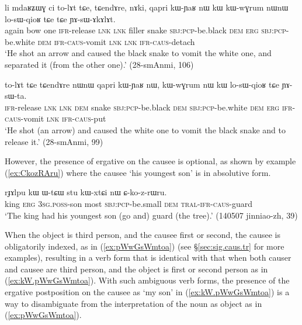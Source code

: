 \begin{exe}
\ex \label{ex:kW.losWqioR1}
 \gll   li mdaʁʑɯɣ ci to-lɤt tɕe, tɕendɤre, nɤki, qapri kɯ-ɲaʁ nɯ kɯ kɯ-wɣrum nɯnɯ lo-sɯ-qioʁ tɕe tɕe ɲɤ-sɯ-ɤkɤlɤt. \\
 again bow one \textsc{ifr}-release \textsc{lnk} \textsc{lnk} filler snake \textsc{sbj}:\textsc{pcp}-be.black \textsc{dem} \textsc{erg} \textsc{sbj}:\textsc{pcp}-be.white \textsc{dem} \textsc{ifr}-\textsc{caus}-vomit \textsc{lnk} \textsc{lnk} \textsc{ifr}-\textsc{caus}-detach \\
 \glt `He shot an arrow and caused the black snake to vomit the white one, and separated it (from the other one).' (28-smAnmi, 106)
\end{exe}

\begin{exe}
\ex \label{ex:kW.losWqioR2}
 \gll  to-lɤt tɕe tɕendɤre nɯnɯ qapri kɯ-ɲaʁ nɯ, kɯ-wɣrum nɯ kɯ lo-sɯ-qioʁ tɕe ɲɤ-sɯ-ta. \\
  \textsc{ifr}-release \textsc{lnk} \textsc{lnk} \textsc{dem} snake \textsc{sbj}:\textsc{pcp}-be.black \textsc{dem}  \textsc{sbj}:\textsc{pcp}-be.white \textsc{dem} \textsc{erg} \textsc{ifr}-\textsc{caus}-vomit \textsc{lnk} \textsc{ifr}-\textsc{caus}-put \\
  \glt `He shot (an arrow) and caused the white one to vomit the black snake and to release it.' (28-smAnmi, 99)
\end{exe}

However, the presence of ergative on the causee is optional, as shown by example (\ref{ex:CkozRAru}) where the causee  `his youngest son' is in absolutive form.

\begin{exe}
\ex \label{ex:CkozRAru}
 \gll rɟɤlpu kɯ ɯ-tɕɯ stu kɯ-xtɕi nɯ ɕ-ko-z-rɯru. \\
 king \textsc{erg} \textsc{3sg}.\textsc{poss}-son most \textsc{sbj}:\textsc{pcp}-be.small \textsc{dem} \textsc{tral}-\textsc{ifr}-\textsc{caus}-guard \\
 \glt  `The king had his youngest son (go and) guard (the tree).' (140507 jinniao-zh, 39)
\end{exe}

When the object is third person, and the causee first or second, the causee is obligatorily indexed, as in (\ref{ex:pWwGsWmtoa}) (see §\ref{sec:sig.caus.tr} for more examples), resulting in a verb form that is identical with that when both causer and causee are third person, and the object is first or second person as in (\ref{ex:kW.pWwGsWmtoa}). With such ambiguous verb forms, the presence of the ergative postposition on the causee as  `my son' in (\ref{ex:kW.pWwGsWmtoa}) is a way to disambiguate from the interpretation of the noun as object as in (\ref{ex:pWwGsWmtoa}). 

